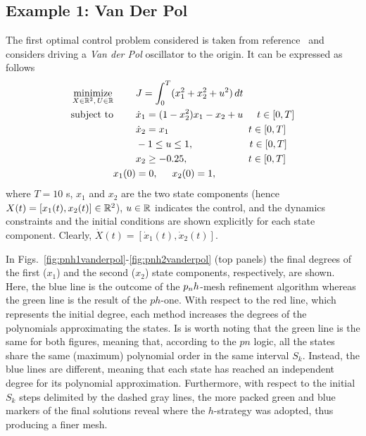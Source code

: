 \subsection*{Example 1: Van Der Pol}
The first optimal control problem considered is taken from reference~\cite{casadi:DOC:2018} and considers
driving a \emph{Van der Pol} oscillator to the origin. It can be expressed as follows
\begin{subequations}\label{eq:vanderpol}
	\begin{align}
	\underset{X \in \mathbb{R}^{2}, \, U \in \mathbb{R}}{\text{minimize}}\hspace{8mm}
	&J = \int_{0}^{T}(x_1^{2} + x_2^{2} + u^{2})\,dt  \label{eq:vancost}\\
	\text{subject to} \hspace{8mm}
	& \dot{x}_1 = (1 - x_2^{2})x_{1} - x_2 + u \hspace{5mm} t \in[0,T] \label{eq:vandyn1}\\
	& \dot{x}_2 = x_1 \hspace{28.5mm} t \in[0,T] \label{eq:vandyn2}\\
	& -1  \leq u \leq 1,  \hspace{20mm} t \in[0,T] \label{eq:vanpath1}\\
	& x_2 \geq -0.25,  \hspace{21.5mm} t \in[0,T] \label{eq:vanpath2}\\
	 x_1(0) &= 0, \hspace{5mm} x_2(0) = 1, \label{eq:initial1}\\		
	\end{align}
\end{subequations}
where $T = 10$ s, $x_1$ and $x_2$ are the two state components (hence $X(t) = [x_1(t), x_2(t)]\in \mathbb{R}^2$), $u\in\mathbb{R}$ indicates the control, and the dynamics constraints and the initial conditions are shown explicitly for each state component. Clearly, $\dot{X}(t) = [\dot{x}_1(t), \dot{x}_2(t)]$.

In Figs.~\ref{fig:pnh1vanderpol}-\ref{fig:pnh2vanderpol} (top panels) the final degrees of the first ($x_1$) and the second ($x_2$) state components, respectively, are shown. Here, the blue line is the outcome of the $p_{n}h$-mesh refinement algorithm whereas the green line is the result of the $ph$-one. With respect to the red line, which represents the initial degree, each method increases the degrees of the polynomials approximating the states. Is is worth noting that the green line is the same for both figures, meaning that, according to the $pn$ logic, all the states share the same (maximum) polynomial order in the same interval $S_k$. Instead, the blue lines are different, meaning that each state has reached an independent degree for its polynomial approximation.
Furthermore, with respect to the initial $S_k$ steps delimited by the dashed gray lines, the more packed green and blue markers of the final solutions reveal where the $h$-strategy was adopted, thus producing a finer mesh.

